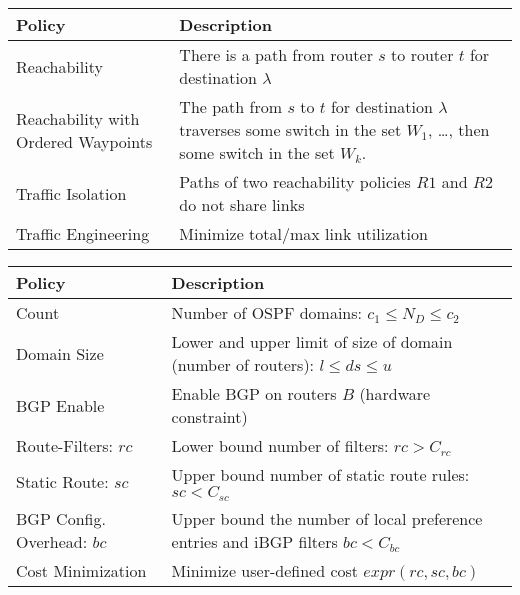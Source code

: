 \begin{table}[!t]
\begin{small}
	\begin{center}
		\begin{tabular}{m{7.8em}  m{15.9em} } 
			{\bf Policy} & {\bf Description} \\ 
			\hline
			Reachability & There is a path from router $s$ to router $t$ for destination $\lambda$ \\ \hline
			Reachability with \newline Ordered Waypoints & The path  from $s$ to $t$ for destination $\lambda$ 
			traverses some switch in the set $W_1$, \ldots, then some switch in the set $W_k$.\\ \hline
			Traffic Isolation & Paths of two reachability policies $R1$ and $R2$ do not share  links \\ \hline
			Traffic Engineering  & Minimize total/max link utilization \\
		\end{tabular}
	\end{center}
	 \label{tab:policysupport} 
\end{small}
\end{table}
\begin{table}[!t]
	\begin{small}
		\begin{center}
			\begin{tabular}{m{6.5em}  m{17.7em} } 
				{\bf Policy} & {\bf Description} \\ 
				\hline
				Count  & Number of OSPF domains: $c_1\leq N_D\leq c_2$  \\ \hline
				Domain Size  & Lower and upper
				limit of size of domain (number of routers): $l\leq ds\leq u$ \\ \hline
				BGP \newline Enable & Enable BGP on routers $B$ (hardware constraint) \\ \hline
				Route-Filters: $rc$ & Lower bound number of filters:
				$rc > C_{rc}$\\ \hline
				Static Route: ${sc}$ & Upper bound number of static route rules: $sc < C_{sc}$ \\ \hline
				BGP Config. Overhead: $bc$ & Upper bound the number of local preference entries and iBGP filters $bc < C_{bc}$ \\ \hline
				Cost Minimization & Minimize user-defined cost $expr(rc, sc, bc)$
			\end{tabular}
		\end{center}
		 \label{tab:configpolicysupport} 
	\end{small}
\end{table}
